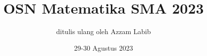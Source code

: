 \documentclass[12pt]{scrartcl}
\title{OSN Matematika SMA 2023}
\author{ditulis ulang oleh Azzam Labib}
\date{29-30 Agustus 2023}
\begin{document}
\maketitle

\renewcommand*\contentsname{Daftar Isi}
\tableofcontents

\newpage

\newpage

\end{document}

